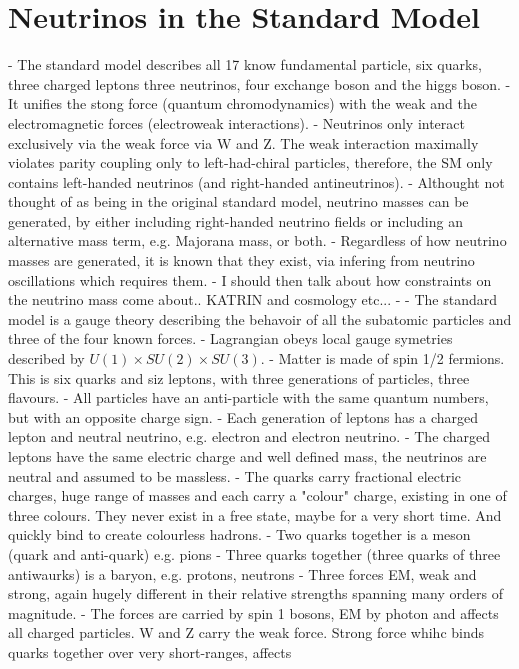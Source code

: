 \section{Neutrinos in the Standard Model}
\label{sec:theory_sm}

- The standard model describes all 17 know fundamental particle, six quarks, three charged leptons
three neutrinos, four exchange boson and the higgs boson.
- It unifies the stong force (quantum chromodynamics) with the weak and the electromagnetic forces
(electroweak interactions).
- Neutrinos only interact exclusively via the weak force via W and Z. The weak interaction
maximally violates parity coupling only to left-had-chiral particles, therefore, the SM only
contains left-handed neutrinos (and right-handed antineutrinos).
- Althought not thought of as being in the original standard model, neutrino masses can be
generated, by either including right-handed neutrino fields or including an alternative mass term,
e.g. Majorana mass, or both.
- Regardless of how neutrino masses are generated, it is known that they exist, via infering
from neutrino oscillations which requires them.
- I should then talk about how constraints on the neutrino mass come about.. KATRIN and cosmology
etc...
-
- The standard model is a gauge theory describing the behavoir of all the subatomic particles and
three of the four known forces.
- Lagrangian obeys local gauge symetries described by $U(1) \times SU(2) \times SU(3)$.
- Matter is made of spin 1/2 fermions. This is six quarks and siz leptons, with three generations
of particles, three flavours.
- All particles have an anti-particle with the same quantum numbers, but with an opposite charge
sign.
- Each generation of leptons has a charged lepton and neutral neutrino, e.g. electron and
electron neutrino.
- The charged leptons have the same electric charge and well defined mass, the neutrinos are
neutral and assumed to be massless.
- The quarks carry fractional electric charges, huge range of masses and each carry a "colour"
charge, existing in one of three colours. They never exist in a free state, maybe for a very short
time. And quickly bind to create colourless hadrons.
- Two quarks together is a meson (quark and anti-quark) e.g. pions
- Three quarks together (three quarks of three antiwaurks) is a baryon, e.g. protons, neutrons
- Three forces EM, weak and strong, again hugely different in their relative strengths spanning
many orders of magnitude.
- The forces are carried by spin 1 bosons, EM by photon and affects all charged particles. W and
Z carry the weak force. Strong force whihc binds quarks together over very short-ranges, affects
